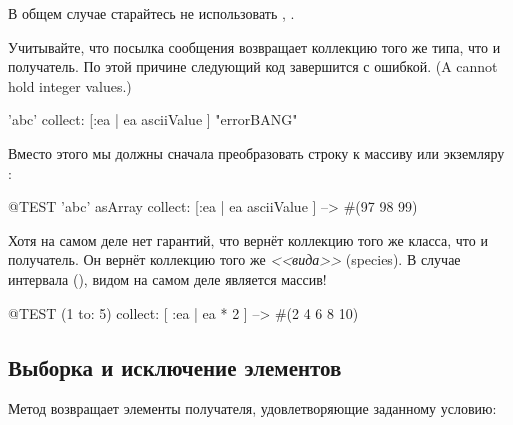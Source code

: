 \documentclass[a4paper,10pt,twoside]{book}
\begin{document}
В общем случае старайтесь не использовать , .

Учитывайте, что посылка сообщения  возвращает коллекцию того же типа, что и получатель.
По этой причине следующий код завершится с ошибкой.
(A  cannot hold integer values.)
\begin{code}{}
'abc' collect: [:ea | ea asciiValue ]      "errorBANG"
\end{code}
\noindent
Вместо этого мы должны сначала преобразовать строку к массиву или экземляру :
\begin{code}{@TEST}
'abc' asArray collect: [:ea | ea asciiValue ] --> #(97 98 99)
\end{code}

Хотя на самом деле нет гарантий, что  вернёт коллекцию того же класса, что и получатель. Он вернёт коллекцию того же \emph{<<вида>>} (species). В случае интервала (), видом на самом деле является массив!
\begin{code}{@TEST}
(1 to: 5) collect: [ :ea | ea * 2 ] --> #(2 4 6 8 10)
\end{code}

\subsection{Выборка и исключение элементов}

Метод  возвращает элементы получателя, удовлетворяющие заданному условию:
\end{document}
